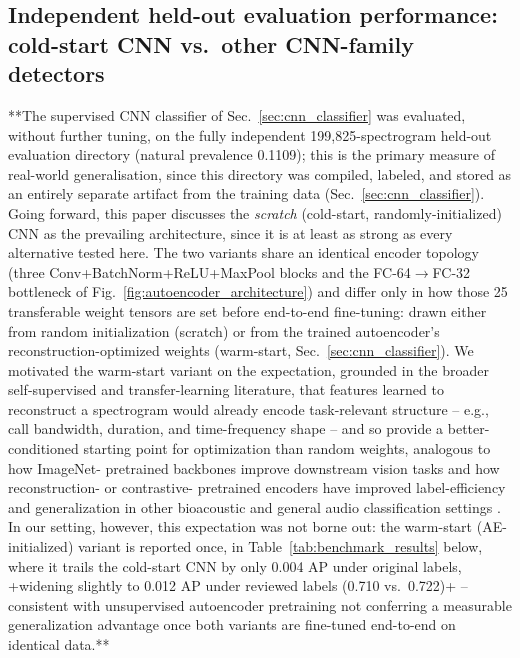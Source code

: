 \documentclass[preprint,NumberedRefs]{JASAnew}
\begin{document}
\subsection{Independent held-out evaluation performance: cold-start CNN vs.\ other CNN-family detectors}
\label{sec:CNNFamily}

**The supervised CNN classifier of Sec.~\ref{sec:cnn_classifier} was evaluated,
without further tuning, on the fully independent 199,825-spectrogram held-out
evaluation directory (natural prevalence 0.1109); this is the primary measure
of real-world generalisation, since this directory was compiled, labeled, and
stored as an entirely separate artifact from the training data
(Sec.~\ref{sec:cnn_classifier}). Going forward, this paper discusses the
\emph{scratch} (cold-start, randomly-initialized) CNN as the prevailing
architecture, since it is at least as strong as every alternative tested
here. The two variants share an identical encoder topology (three
Conv+BatchNorm+ReLU+MaxPool blocks and the FC-64$\to$FC-32 bottleneck of
Fig.~\ref{fig:autoencoder_architecture}) and differ only in how those 25
transferable weight tensors are set before end-to-end fine-tuning: drawn
either from random initialization (scratch) or from the trained
autoencoder's reconstruction-optimized weights (warm-start,
Sec.~\ref{sec:cnn_classifier}). We motivated the warm-start variant on the
expectation, grounded in the broader self-supervised and transfer-learning
literature, that features learned to reconstruct a spectrogram would
already encode task-relevant structure -- e.g., call bandwidth, duration,
and time-frequency shape -- and so provide a better-conditioned starting
point for optimization than random weights, analogous to how ImageNet-
pretrained backbones improve downstream vision tasks
\citep{yosinski2014transferable} and how reconstruction- or contrastive-
pretrained encoders have improved label-efficiency and generalization in
other bioacoustic and general audio classification settings
\citep{ozanich2021deep,chien2023automatic}. In our setting, however, this
expectation was not borne out: the warm-start (AE-initialized) variant is
reported once, in Table~\ref{tab:benchmark_results} below, where it trails
the cold-start CNN by only 0.004 AP under original labels, {+}widening
slightly to 0.012 AP under reviewed labels (0.710 vs.\ 0.722){+} --
consistent with unsupervised autoencoder pretraining not conferring a
measurable generalization advantage once both variants are fine-tuned
end-to-end on identical data.**
\end{document}
